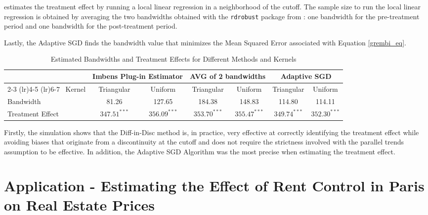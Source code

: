 \documentclass[12pt]{article}
\theoremstyle{plain}
\theoremstyle{remark}
\def\code#1{\texttt{#1}}
\begin{document}
\textcite{grembi2016do} estimates the treatment effect by running a local linear regression in a neighborhood of the cutoff. The sample size to run the local linear regression is obtained by averaging the two bandwidths obtained with the \code{rdrobust} package from \textcite{Calonico2015}: one bandwidth for the pre-treatment period and one bandwidth for the post-treatment period.

Lastly, the Adaptive SGD finds the bandwidth value that minimizes the Mean Squared Error associated with Equation \ref{grembi_eq}.

\begin{table}[h]
    \centering
    \begin{tabular}{lcccccc}
        \toprule
        & \multicolumn{2}{c}{Imbens Plug-in Estimator} & \multicolumn{2}{c}{AVG of 2 bandwidths} & \multicolumn{2}{c}{Adaptive SGD} \\
        \cmidrule(lr){2-3} \cmidrule(lr){4-5} \cmidrule(lr){6-7}
        \multirow{2}{*}\ Kernel & Triangular & Uniform & Triangular & Uniform & Triangular & Uniform \\
        \midrule
        Bandwidth & 81.26 & 127.65 & 184.38 & 148.83 & 114.80 & 114.11 \\ 
        Treatment Effect & $347.51^{***}$ & $356.09^{***}$ & $353.70^{***}$ & $355.47^{***}$ & $349.74^{***}$ & $352.30^{***}$ \\
        \bottomrule
    \end{tabular}
    \caption{Estimated Bandwidths and Treatment Effects for Different Methods and Kernels}
    \label{tab:bandwidths_treatments}
\end{table}

Firstly, the simulation shows that the Diff-in-Disc method is, in practice, very effective at correctly identifying the treatment effect while avoiding biases that originate from a discontinuity at the cutoff and does not require the strictness involved with the parallel trends assumption to be effective. In addition, the Adaptive SGD Algorithm was the most precise when estimating the treatment effect.

\newpage
\section{Application - Estimating the Effect of Rent Control in Paris on Real Estate Prices}
\end{document}

